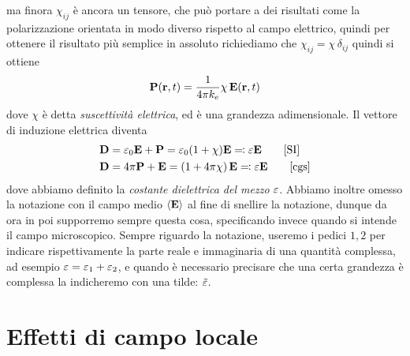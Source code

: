 ma finora $ \chi_{i j} $ è ancora un tensore, che può portare a dei risultati come la polarizzazione orientata in modo diverso rispetto al campo elettrico, 
quindi per ottenere il risultato più semplice in assoluto richiediamo che $ \chi_{i j} = \chi \, \delta_{ij} $ quindi si ottiene
\begin{align} \label{eq: relazione fra P e E}
  \mathbf{P}(\mathbf{r}, t) = \frac1{4\pi k_e} \chi \,\mathbf{E}(\mathbf{r}, t)
\end{align}
dove $ \chi $ è detta \textit{suscettività elettrica}, ed è una grandezza adimensionale. Il vettore di induzione elettrica diventa
\begin{align}
  &\v{D} = \eps_0 \v{E} + \v{P} = \eps_0 (1 + \chi) \v{E} \eqcolon \eps \v{E}  \tag*{[\textnormal{SI}]}
  \\
  &\v{D} = 4\pi \v{P} + \v{E} = \left( 1 + 4\pi \chi \right) \v{E} \eqcolon \eps \v{E} \tag*{[\textnormal{cgs}]}
\end{align}
dove abbiamo definito la \textit{costante dielettrica del mezzo} $ \varepsilon $. Abbiamo inoltre omesso la notazione con il campo medio $ \langle \mathbf{E} \rangle $ 
al fine di snellire la notazione, dunque da ora in poi supporremo sempre questa cosa, specificando invece quando si intende il campo microscopico.
Sempre riguardo la notazione, useremo i pedici $ 1,2 $ per indicare rispettivamente la parte reale e immaginaria di una quantità complessa, ad esempio 
$ \varepsilon = \varepsilon_1 + \varepsilon_2 $, e quando è necessario precisare che una certa grandezza è complessa la indicheremo con una tilde: $ \tilde{\varepsilon} $.

\section{Effetti di campo locale}




